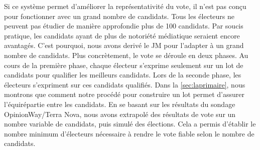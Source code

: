 \documentclass[conference]{IEEEtran}
\begin{document}
Si ce syst\`eme permet d'am\'eliorer la repr\'esentativit\'e du vote, il n'est pas con\c{c}u pour fonctionner avec un grand nombre de candidats. Tous les \'electeurs ne peuvent pas \'etudier de mani\`ere approfondie plus de 100 candidats. Par soucis pratique, les candidats ayant de plus de notori\'et\'e m\'ediatique seraient encore avantag\'es. C'est pourquoi, nous avons deriv\'e le JM pour l'adapter \`a un grand nombre de candidats. Plus concr\`etement,
le vote se d\'eroule en deux phases. Au cours de la premi\`ere phase, chaque \'electeur s'exprime seulement sur un lot de candidats pour qualifier les meilleurs candidats. Lors de la seconde phase, les \'electeurs s'expriment sur ces candidats qualifi\'es.
Dans la \cref{sec:laprimaire}, nous montrons que comment notre proc\'ed\'e pour construire un lot permet d'assurer l'\'equir\'epartie entre les candidats. En se basant sur les r\'esultats du sondage OpinionWay/Terra Nova, nous avons extrapol\'e des r\'esultats de vote sur un nombre variable de candidats, puis simul\'e des \'elections. Cela a permis d'\'etablir le nombre minimum d'\'electeurs n\'ecessaire \`a rendre le vote fiable selon le nombre de candidats.
\end{document}
